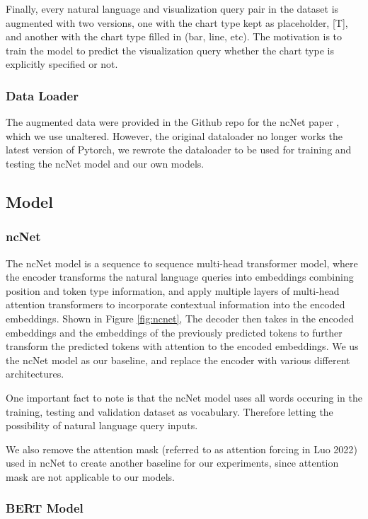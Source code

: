 \documentclass[
	a4paper, %
	10pt, %
	unnumberedsections, %
	twoside, %
]{t0003}
\begin{document}
Finally, every natural language and visualization query pair in the dataset is augmented with two versions, one with the chart type kept as placeholder, [T], and another with the chart type filled in (bar, line, etc). The motivation is to train the model to predict the visualization query whether the chart type is explicitly specified or not.

\subsubsection{Data Loader}

The augmented data were provided in the Github repo for the ncNet paper\cite{Luo:2022qr} , which we use unaltered. However, the original dataloader no longer works the latest version of Pytorch, we rewrote the dataloader to be used for training and testing the ncNet model and our own models.

\subsection{Model}

\subsubsection{ncNet}

The ncNet\cite{Luo:2022qr} model is a sequence to sequence multi-head transformer model, where the encoder transforms the natural language queries into embeddings combining position and token type information, and apply multiple layers of multi-head attention transformers to incorporate contextual information into the encoded embeddings. Shown in Figure  \ref{fig:ncnet},  The decoder then takes in the encoded embeddings and the embeddings of the previously predicted tokens to further transform the predicted tokens with attention to the encoded embeddings. We us the ncNet model as our baseline, and replace the encoder with various different architectures.

One important fact to note is that the ncNet model uses all words occuring in the training, testing and validation dataset as vocabulary. Therefore letting the possibility of natural language query inputs.

We also remove the attention mask (referred to as attention forcing in Luo 2022\cite{Luo:2022qr}) used in ncNet to create another baseline for our experiments, since attention mask are not applicable to our models.

\subsubsection{BERT Model}
\end{document}
